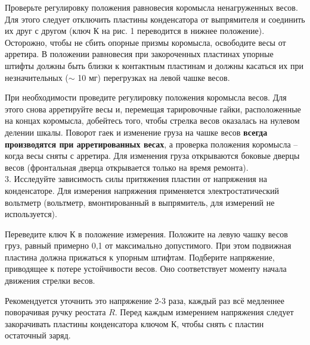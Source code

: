 Проверьте регулировку положения равновесия коромысла ненагруженных весов. Для этого следует отключить пластины конденсатора от выпрямителя и соединить их друг с другом (ключ К на рис. 1 переводится в нижнее положение). Осторожно, чтобы не сбить опорные призмы коромысла, освободите весы от арретира. В положении равновесия при закороченных пластинах упорные штифты должны быть близки к контактным пластинам и должны касаться их при незначительных ($\sim$ 10 мг) перегрузках на левой чашке весов.
   
При необходимости проведите регулировку положения коромысла весов. Для этого снова арретируйте весы и, перемещая тарировочные гайки, расположенные на концах коромысла, добейтесь того, чтобы стрелка весов оказалась на нулевом делении шкалы. Поворот гаек и изменение груза на чашке весов \textbf{всегда производятся при арретированных весах}, а проверка положения коромысла -- когда весы сняты с арретира. Для изменения груза открываются боковые дверцы весов (фронтальная дверца открывается только на время ремонта).\\
3. Исследуйте зависимость силы притяжения пластин от напряжения на конденсаторе. Для измерения напряжения применяется электростатический вольтметр (вольтметр, вмонтированный в выпрямитель, для измерений не используется).

Переведите ключ К в положение измерения. Положите на левую чашку весов груз, равный примерно 0,1 от максимально допустимого. При этом подвижная пластина должна прижаться к упорным штифтам. Подберите напряжение, приводящее к потере устойчивости весов. Оно соответствует моменту начала движения стрелки весов.

Рекомендуется уточнить это напряжение 2-3 раза, каждый раз всё медленнее поворачивая ручку реостата $R$. Перед каждым измерением напряжения следует закорачивать пластины конденсатора ключом К, чтобы снять с пластин остаточный заряд.

